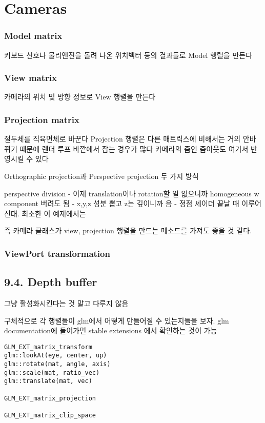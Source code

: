 \documentclass[a4paper]{report}
\begin{document}
\chapter{Cameras}






\subsection{Model matrix}

키보드 신호나 물리엔진을 돌려 나온 위치벡터 등의 결과들로 Model 행렬을 만든다

\subsection{View matrix}

카메라의 위치 및 방향 정보로 View 행렬을 만든다


\subsection{Projection matrix}
절두체를 직육면체로 바꾼다
Projection 행렬은 다른 매트릭스에 비해서는 거의 안바뀌기 때문에 렌더 루프 바깥에서 잡는 경우가 많다
카메라의 줌인 줌아웃도 여기서 반영시킬 수 있다

Orthographic projection과 Perspective projection
두 가지 방식

perspective division
  - 이제 translation이나 rotation할 일 없으니까 homogeneous w component 버려도 됨
  - x,y,z 성분 뽑고 z는 깊이니까 음
  - 정점 셰이더 끝날 때 이루어진대. 최소한 이 예제에서는


즉 카메라 클래스가 view, projection 행렬을 만드는 메소드를 가져도 좋을 것 같다.

\subsection{ViewPort transformation}




\section{9.4. Depth buffer}

그냥 활성화시킨다는 것 말고 다루지 않음



구체적으로 각 행렬들이 glm에서 어떻게 만들어질 수 있는지들을 보자.
glm documentation에 들어가면 stable extensions 에서 확인하는 것이 가능
\begin{lstlisting}
GLM_EXT_matrix_transform
glm::lookAt(eye, center, up)
glm::rotate(mat, angle, axis)
glm::scale(mat, ratio_vec)
glm::translate(mat, vec)

GLM_EXT_matrix_projection

GLM_EXT_matrix_clip_space
\end{lstlisting}
\end{document}
